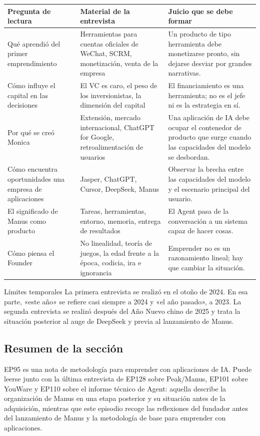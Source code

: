 \documentclass[a4paper]{article}
\begin{document}
\noindent\begin{tabularx}{\textwidth}{p{}p{}X}
\toprule
Pregunta de lectura & Material de la entrevista & Juicio que se debe formar \\
\midrule
Qué aprendió del primer emprendimiento & Herramientas para cuentas oficiales de WeChat, SCRM, monetización, venta de la empresa & Un producto de tipo herramienta debe monetizarse pronto, sin dejarse desviar por grandes narrativas. \\
Cómo influye el capital en las decisiones & El VC es caro, el peso de los inversionistas, la dimensión del capital & El financiamiento es una herramienta; no es el jefe ni es la estrategia en sí. \\
Por qué se creó Monica & Extensión, mercado internacional, ChatGPT for Google, retroalimentación de usuarios & Una aplicación de IA debe ocupar el contenedor de producto que surge cuando las capacidades del modelo se desbordan. \\
Cómo encuentra oportunidades una empresa de aplicaciones & Jasper, ChatGPT, Cursor, DeepSeek, Manus & Observar la brecha entre las capacidades del modelo y el escenario principal del usuario. \\
El significado de Manus como producto & Tareas, herramientas, entorno, memoria, entrega de resultados & El Agent pasa de la conversación a un sistema capaz de hacer cosas. \\
Cómo piensa el Founder & No linealidad, teoría de juegos, la edad frente a la época, codicia, ira e ignorancia & Emprender no es un razonamiento lineal; hay que cambiar la situación. \\
\bottomrule
\end{tabularx}

\begin{warningbox}{Límites temporales}
La primera entrevista se realizó en el otoño de 2024. En esa parte, «este año» se refiere casi siempre a 2024 y «el año pasado», a 2023. La segunda entrevista se realizó después del Año Nuevo chino de 2025 y trata la situación posterior al auge de DeepSeek y previa al lanzamiento de Manus.
\end{warningbox}

\subsection{Resumen de la sección}

EP95 es una nota de metodología para emprender con aplicaciones de IA. Puede leerse junto con la última entrevista de EP128 sobre Peak/Manus, EP101 sobre YouWare y EP110 sobre el informe técnico de Agent: aquella describe la organización de Manus en una etapa posterior y su situación antes de la adquisición, mientras que este episodio recoge las reflexiones del fundador antes del lanzamiento de Manus y la metodología de base para emprender con aplicaciones.
\end{document}
